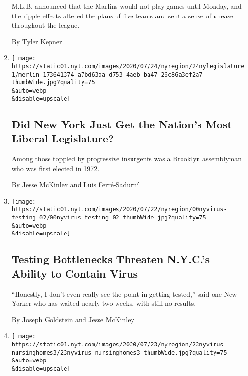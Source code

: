 \begin{enumerate}
  M.L.B. announced that the Marlins would not play games until Monday,
  and the ripple effects altered the plans of five teams and sent a
  sense of unease throughout the league.

  By Tyler Kepner
\item
  \href{/2020/07/24/nyregion/progressive-primaries-ny-legislature.html}{}

  \texttt{[image: https://static01.nyt.com/images/2020/07/24/nyregion/24nylegislature1/merlin\_173641374\_a7bd63aa-d753-4aeb-ba47-26c86a3ef2a7-thumbWide.jpg?quality=75\\\&auto=webp\\\&disable=upscale]}

  \hypertarget{did-new-york-just-get-the-nations-most-liberal-legislature}{%
  \subsection{Did New York Just Get the Nation's Most Liberal
  Legislature?}\label{did-new-york-just-get-the-nations-most-liberal-legislature}}

  Among those toppled by progressive insurgents was a Brooklyn
  assemblyman who was first elected in 1972.

  By Jesse McKinley and Luis Ferré-Sadurní
\item
  \href{/2020/07/23/nyregion/coronavirus-testing-nyc.html}{}

  \texttt{[image: https://static01.nyt.com/images/2020/07/22/nyregion/00nyvirus-testing-02/00nyvirus-testing-02-thumbWide.jpg?quality=75\\\&auto=webp\\\&disable=upscale]}

  \hypertarget{testing-bottlenecks-threaten-nycs-ability-to-contain-virus}{%
  \subsection{Testing Bottlenecks Threaten N.Y.C.'s Ability to Contain
  Virus}\label{testing-bottlenecks-threaten-nycs-ability-to-contain-virus}}

  ``Honestly, I don't even really see the point in getting tested,''
  said one New Yorker who has waited nearly two weeks, with still no
  results.

  By Joseph Goldstein and Jesse McKinley
\item
  \href{/2020/07/23/nyregion/nursing-homes-deaths-cuomo.html}{}

  \texttt{[image: https://static01.nyt.com/images/2020/07/23/nyregion/23nyvirus-nursinghomes3/23nyvirus-nursinghomes3-thumbWide.jpg?quality=75\\\&auto=webp\\\&disable=upscale]}


\end{enumerate}

